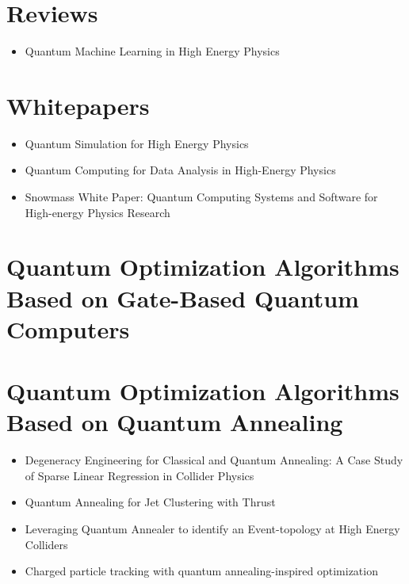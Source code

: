 \section{Reviews}

\begin{itemize}
   \item Quantum Machine Learning in High Energy Physics~\cite{Guan:2020bdl}
\end{itemize}


\section{Whitepapers}

\begin{itemize}
   \item Quantum Simulation for High Energy Physics~\cite{Bauer:2022hpo}
   \item Quantum Computing for Data Analysis in High-Energy Physics~\cite{Delgado:2022tpc}
   \item Snowmass White Paper: Quantum Computing Systems and Software for High-energy Physics Research~\cite{Humble:2022vtm}
\end{itemize}


\section{Quantum Optimization Algorithms Based on Gate-Based Quantum Computers}



\section{Quantum Optimization Algorithms Based on Quantum Annealing}

\begin{itemize}
   \item Degeneracy Engineering for Classical and Quantum Annealing: A Case Study of Sparse Linear Regression in Collider Physics~\cite{Anschuetz:2022rwu}
   \item Quantum Annealing for Jet Clustering with Thrust~\cite{Delgado:2022snu}
   \item Leveraging Quantum Annealer to identify an Event-topology at High Energy Colliders~\cite{Kim:2021wrr}
   \item Charged particle tracking with quantum annealing-inspired optimization~\cite{Zlokapa:2019tkn}
\end{itemize}


